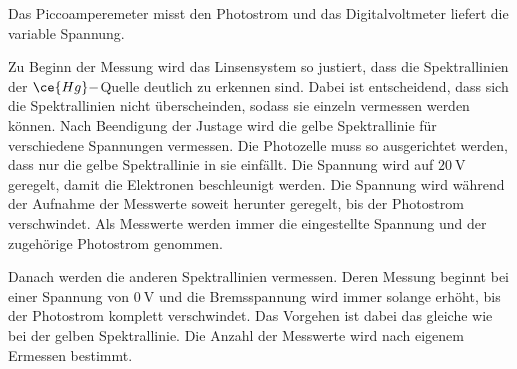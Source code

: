 Das Piccoamperemeter misst den Photostrom und das Digitalvoltmeter liefert die
variable Spannung.

Zu Beginn der Messung wird das Linsensystem so justiert, dass die Spektrallinien
der $\ce{Hg}-$Quelle deutlich zu erkennen sind. Dabei ist entscheidend, dass sich
die Spektrallinien nicht überscheinden, sodass sie einzeln vermessen werden können.
Nach Beendigung der Justage wird die gelbe Spektrallinie für verschiedene Spannungen
vermessen. Die Photozelle muss so ausgerichtet werden, dass nur die gelbe Spektrallinie
in sie einfällt. Die Spannung wird auf $\SI{20}{\volt}$ geregelt, damit die
Elektronen beschleunigt werden. Die Spannung wird während der Aufnahme der Messwerte soweit
herunter geregelt, bis der Photostrom verschwindet. Als Messwerte werden immer
die eingestellte Spannung und der zugehörige Photostrom genommen.

Danach werden die anderen Spektrallinien vermessen. Deren Messung beginnt bei einer
Spannung von $\SI{0}{\volt}$ und die Bremsspannung wird immer solange erhöht, bis
der Photostrom komplett verschwindet. Das Vorgehen ist dabei das gleiche wie
bei der gelben Spektrallinie.
Die Anzahl der Messwerte wird nach eigenem Ermessen bestimmt.

